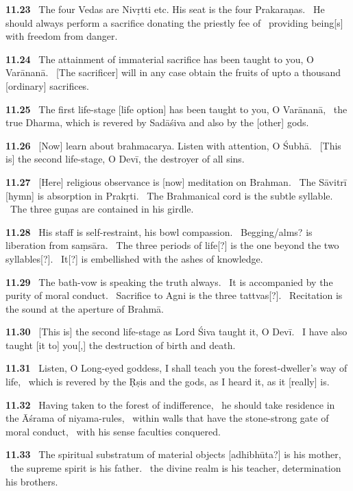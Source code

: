 \documentclass{article}
\begin{document}
\textbf{11.23}%
\ The four Vedas are Nivṛtti etc. His seat is the four Prakaraṇas.%
\ He should always perform a sacrifice donating the priestly fee of%
\              providing being[s] with freedom from danger.%


\textbf{11.24}%
\ The attainment of immaterial sacrifice has been taught to you, O Varānanā.%
\ [The sacrificer] will in any case obtain the fruits of upto a thousand [ordinary] sacrifices.%


\textbf{11.25}%
\ The first life-stage [life option] has been taught to you, O Varānanā,%
\ the true Dharma, which is revered by Sadāśiva and also by the [other] gods.%


\textbf{11.26}%
\ [Now] learn about brahmacarya. Listen with attention, O Śubhā.%
\ [This is] the second life-stage, O Devī, the destroyer of all sins.%


\textbf{11.27}%
\ [Here] religious observance is [now] meditation on Brahman.%
\              The Sāvitrī [hymn] is absorption in Prakṛti.%
\ The Brahmanical cord is the subtle syllable.%
\              The three guṇas are contained in his girdle.%


\textbf{11.28}%
\ His staff is self-restraint, his bowl compassion.%
\                         Begging/alms? is liberation from saṃsāra.%
\ The three periods of life[?] is the one beyond the two syllables[?].%
\              It[?] is embellished with the ashes of knowledge.%


\textbf{11.29}%
\ The bath-vow is speaking the truth always.%
\              It is accompanied by the purity of moral conduct.%
\ Sacrifice to Agni is the three tattvas[?].%
\                 Recitation is the sound at the aperture of Brahmā.%


\textbf{11.30}%
\ [This is] the second life-stage as Lord Śiva taught it, O Devī.%
\ I have also taught [it to] you[,] the destruction of birth and death.%


\textbf{11.31}%
\ Listen, O Long-eyed goddess, I shall teach you the forest-dweller's way of life,%
\ which is revered by the Ṛṣis and the gods, as I heard it, as it [really] is.%


\textbf{11.32}%
\ Having taken to the forest of indifference,%
\                         he should take residence in the Āśrama of niyama-rules,%
\ within walls that have the stone-strong gate of moral conduct,%
\                  with his sense faculties conquered.%


\textbf{11.33}%
\ The spiritual substratum of material objects [adhibhūta?] is his mother,%
\                      the supreme spirit is his father.%
\ the divine realm is his teacher, determination his brothers.%
\end{document}
